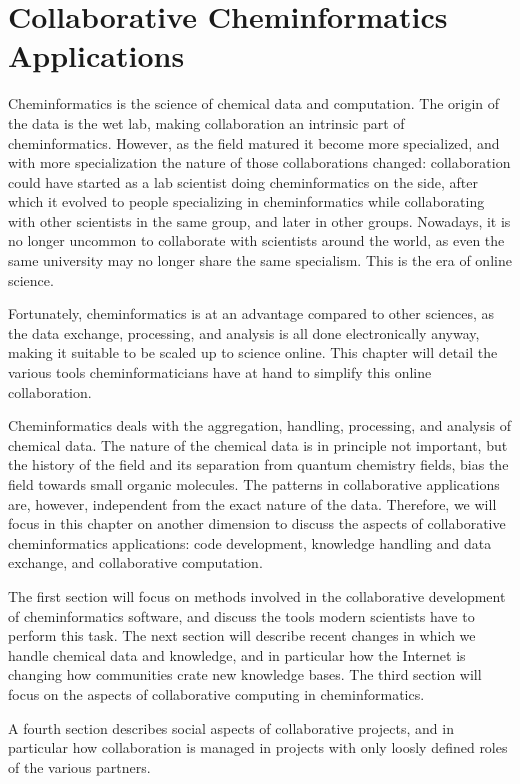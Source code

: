 \documentclass[12pt]{book}
\begin{document}
\chapter{Collaborative Cheminformatics Applications}

Cheminformatics is the science of chemical data and computation.
The origin of the data is the wet lab, making collaboration an
intrinsic part of cheminformatics. However, as the field matured
it become more specialized, and with more specialization the
nature of those collaborations changed: collaboration could
have started as a lab scientist doing cheminformatics on the
side, after which it evolved to people specializing in
cheminformatics while collaborating with other scientists
in the same group, and later in other groups. Nowadays,
it is no longer uncommon to collaborate with scientists around
the world, as even the same university may no longer share
the same specialism. This is the era of online science.

Fortunately, cheminformatics is at an advantage compared to
other sciences, as the data exchange, processing, and analysis
is all done electronically anyway, making it suitable to be
scaled up to science online. This chapter will detail the
various tools cheminformaticians have at hand to simplify
this online collaboration.

Cheminformatics deals with the aggregation, handling, processing, and
analysis of chemical data. The nature of the chemical data is in principle
not important, but the history of the field and its separation from
quantum chemistry fields, bias the field towards small organic molecules.
The patterns in collaborative applications are, however, independent from
the exact nature of the data. Therefore, we will focus in this chapter
on another dimension to discuss the aspects of collaborative
cheminformatics applications: code development, knowledge handling
and data exchange, and collaborative computation.

The first section will focus on methods involved in the collaborative
development of cheminformatics software, and discuss the tools modern
scientists have to perform this task. The next section will describe
recent changes in which we handle chemical data and knowledge, and
in particular how the Internet is changing how communities crate new
knowledge bases. The third section will focus on the aspects of
collaborative computing in cheminformatics.

A fourth section describes social aspects of collaborative projects,
and in particular how collaboration is managed in projects with
only loosly defined roles of the various partners.
\end{document}
